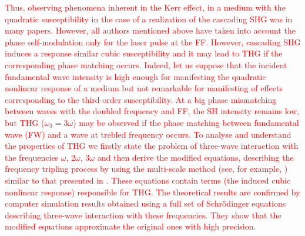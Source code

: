 \documentclass[a4paper, 12pt, onecolumn]{extarticle}
\begin{document}
\textcolor{red}{Thus, observing phenomena inherent in  the Kerr effect, in a medium with the quadratic susceptibility in the case of a realization of the cascading SHG  was in many papers. However, all authors mentioned above have taken into account the phase self-modulation only for the laser pulse at the FF.
However, cascading SHG induces a response similar cubic susceptibility and it may  lead to THG if the corresponding phase matching occurs. Indeed, let us suppose that the incident fundamental wave intensity is high enough for manifesting the quadratic nonlinear response of a medium but not remarkable for manifesting of effects corresponding to the third-order susceptibility. At a big phase mismatching between waves with the doubled frequency and FF, the SH intensity remains low, but  THG (\(\omega_3=3\omega\)) may be observed if the phase matching between fundamental wave (FW) and a wave at trebled frequency occurs.
To analyse and understand the properties of THG  we firstly state the problem of three-wave interaction with the frequencies \(\omega,\,2\omega,\,3\omega \)  and then derive the modified equations, describing the frequency tripling process by using the multi-scale method (see, for example, \cite{bib:n24}) similar to that presented in \cite{bib:n19}. These   equations contain  terms  (the induced cubic nonlinear response) responsible for THG. The theoretical results are confirmed by computer simulation results obtained using a full set of Schr\"{o}dinger equations describing three-wave interaction with these frequencies. They show that the modified equations approximate the original ones with high precision.}
\end{document}
